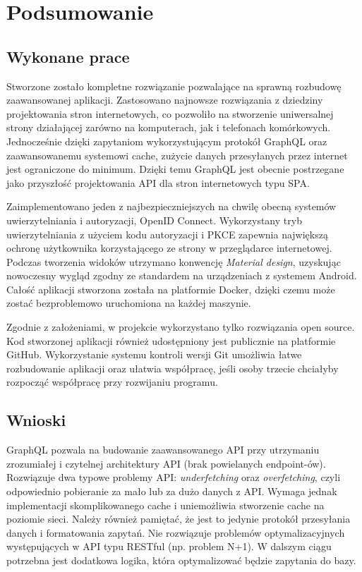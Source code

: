\chapter{Podsumowanie}
\section{Wykonane prace}
	Stworzone zostało kompletne rozwiązanie pozwalające na sprawną rozbudowę zaawansowanej aplikacji.
	Zastosowano najnowsze rozwiązania z dziedziny projektowania stron internetowych,
	co pozwoliło na stworzenie uniwersalnej strony działającej zarówno na komputerach, jak i telefonach komórkowych.
	Jednocześnie dzięki zapytaniom wykorzystującym protokół GraphQL oraz zaawansowanemu systemowi cache, zużycie danych przesyłanych przez internet jest ograniczone do minimum.
	Dzięki temu GraphQL jest obecnie postrzegane jako przyszłość projektowania API dla stron internetowych typu SPA.

	Zaimplementowano jeden z najbezpieczniejszych na chwilę obecną systemów uwierzytelniania i autoryzacji, OpenID Connect.
	Wykorzystany tryb uwierzytelniania z użyciem kodu autoryzacji i PKCE zapewnia największą ochronę użytkownika korzystającego ze strony w przeglądarce internetowej.
	Podczas tworzenia widoków utrzymano konwencję \emph{Material design}, uzyskując nowoczesny wygląd zgodny ze standardem na urządzeniach z systemem Android.
	Całość aplikacji stworzona została na platformie Docker, dzięki czemu może zostać bezproblemowo uruchomiona na każdej maszynie. 
	
	Zgodnie z założeniami, w projekcie wykorzystano tylko rozwiązania open source.
	Kod stworzonej aplikacji również udostępniony jest publicznie na platformie GitHub.
	Wykorzystanie systemu kontroli wersji Git umożliwia łatwe rozbudowanie aplikacji oraz ułatwia współpracę,
	jeśli osoby trzecie chciałyby rozpocząć współpracę przy rozwijaniu programu.
	
\section{Wnioski}
	GraphQL pozwala na budowanie zaawansowanego API przy utrzymaniu zrozumiałej i czytelnej architektury API (brak powielanych endpoint-ów).
	Rozwiązuje dwa typowe problemy API: \emph{underfetching} oraz \emph{overfetching}, czyli odpowiednio pobieranie za mało lub za dużo danych z API.
	Wymaga jednak implementacji skomplikowanego cache i uniemożliwia stworzenie cache na poziomie sieci.
	Należy również pamiętać, że jest to jedynie protokół przesyłania danych i formatowania zapytań.
	Nie rozwiązuje problemów optymalizacyjnych występujących w API typu RESTful (np. problem N+1).
	W dalszym ciągu potrzebna jest dodatkowa logika, która optymalizować będzie zapytania do bazy.

